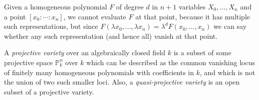 \documentclass[12pt]{article}
\begin{document}
Given a homogeneous polynomial $F$ of degree $d$ in $n+1$ variables $X_0,\ldots,X_n$ and a point $[x_0:\cdots:x_n]$, we cannot evaluate $F$ at that point, because it has multiple such representations, but since $F(\lambda x_0,\ldots,\lambda x_n) = \lambda^d F(x_0,\ldots,x_n)$ we can say whether any such representation (and hence all) vanish at that point.

A \emph{projective variety} over an algebraically closed field $k$ is a subset of some projective space $\mathbb{P}^n_k$ over $k$ which can be described as the common vanishing locus of finitely many homogeneous polynomials with coefficients in $k$, and which is not the union of two such smaller loci.  Also, a \emph{quasi-projective variety} is an open subset of a projective variety.
\end{document}
